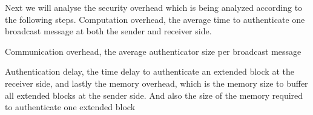 \tiny

Next we will analyse the security overhead which is being analyzed according to the following steps.
Computation overhead, the average time to authenticate one broadcast message at both the sender and receiver side.

Communication overhead, the average authenticator size per broadcast message

Authentication delay, the time delay to authenticate an extended block at the receiver side, and lastly the memory overhead, which is the memory size to buffer all extended blocks at the sender side. And also the size of the memory required to authenticate one extended block